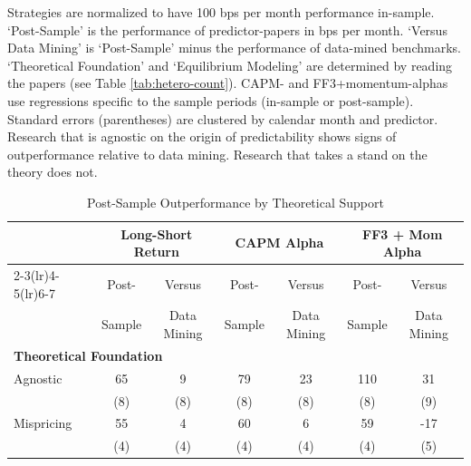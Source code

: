 \begin{table}[!h]
   \caption{Post-Sample Outperformance by Theoretical Support}
   \label{tab:hetero-bytheory}
   
   \begin{singlespace}
      \noindent Strategies are normalized to have 100 bps per month performance in-sample. `Post-Sample' is the performance of predictor-papers in bps per month. `Versus Data Mining' is `Post-Sample' minus the performance of data-mined benchmarks. `Theoretical Foundation' and `Equilibrium Modeling' are determined by reading the papers (see Table \ref{tab:hetero-count}). CAPM- and FF3+momentum-alphas use regressions specific to the sample periods (in-sample or post-sample). Standard errors (parentheses) are clustered by calendar month and predictor. Research that is agnostic on the origin of predictability shows signs of outperformance relative to data mining. Research that takes a stand on the theory does not.
   \end{singlespace}
   \begin{centering}
   \vspace{0ex}
   \par\end{centering}
   \centering{}\setlength{\tabcolsep}{1.2ex} \small
   \begin{center}
   \begin{tabular}{lcccccc}
      \toprule
      & \multicolumn{2}{c}{Long-Short Return} & \multicolumn{2}{c}{CAPM Alpha} & \multicolumn{2}{c}{FF3 + Mom Alpha} \\
      \cmidrule(lr){2-3}\cmidrule(lr){4-5}\cmidrule(lr){6-7}
      & Post- & \multicolumn{1}{c}{Versus} & Post- & \multicolumn{1}{c}{Versus} & Post- & \multicolumn{1}{c}{Versus} \\
      & Sample & \multicolumn{1}{c}{Data Mining} & Sample & \multicolumn{1}{c}{Data Mining} & Sample & \multicolumn{1}{c}{Data Mining} \\
      \midrule
      \multicolumn{7}{l}{\textbf{Theoretical Foundation}} \\
      Agnostic          & 65 & 9 & 79 & 23 & 110 & 31 \\
                        & (8) & (8) & (8) & (8) & (8) & (9) \\
      Mispricing        & 55 & 4 & 60 & 6 & 59 & -17 \\
                        & (4) & (4) & (4) & (4) & (4) & (5) \\

\end{tabular}
\end{center}
\end{table}
